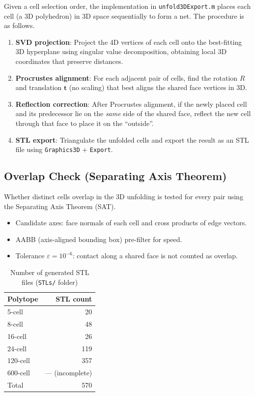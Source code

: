 \documentclass[12pt,a4paper]{article}
\theoremstyle{definition}
\begin{document}
Given a cell selection order, the implementation in
\texttt{unfold3DExport.m} places each cell (a 3D polyhedron) in 3D space
sequentially to form a net.
The procedure is as follows.

\begin{enumerate}[label=\textbf{Step \arabic*.}]
  \item \textbf{SVD projection}:
        Project the 4D vertices of each cell onto the best-fitting 3D
        hyperplane using singular value decomposition, obtaining local
        3D coordinates that preserve distances.

  \item \textbf{Procrustes alignment}:
        For each adjacent pair of cells, find the rotation $R$ and
        translation $\boldsymbol{t}$ (no scaling) that best aligns the
        shared face vertices in 3D.

  \item \textbf{Reflection correction}:
        After Procrustes alignment, if the newly placed cell and its
        predecessor lie on the \emph{same} side of the shared face, reflect
        the new cell through that face to place it on the ``outside''.

  \item \textbf{STL export}:
        Triangulate the unfolded cells and export the result as an STL file
        using \texttt{Graphics3D} + \texttt{Export}.
\end{enumerate}

\subsection{Overlap Check (Separating Axis Theorem)}

Whether distinct cells overlap in the 3D unfolding is tested for every pair
using the Separating Axis Theorem (SAT).

\begin{itemize}
  \item Candidate axes: face normals of each cell and cross products of
        edge vectors.
  \item AABB (axis-aligned bounding box) pre-filter for speed.
  \item Tolerance $\varepsilon = 10^{-6}$: contact along a shared face is
        not counted as overlap.
\end{itemize}

\begin{table}[h]
\centering
\caption{Number of generated STL files (\texttt{STLs/} folder)}
\label{tab:stlcount}
\begin{tabular}{lr}
\toprule
Polytope & STL count \\
\midrule
5-cell   &   20 \\
8-cell   &   48 \\
16-cell  &   26 \\
24-cell  &  119 \\
120-cell &  357 \\
600-cell &  --- (incomplete) \\
\midrule
Total    &  570 \\
\bottomrule
\end{tabular}
\end{table}
\end{document}
